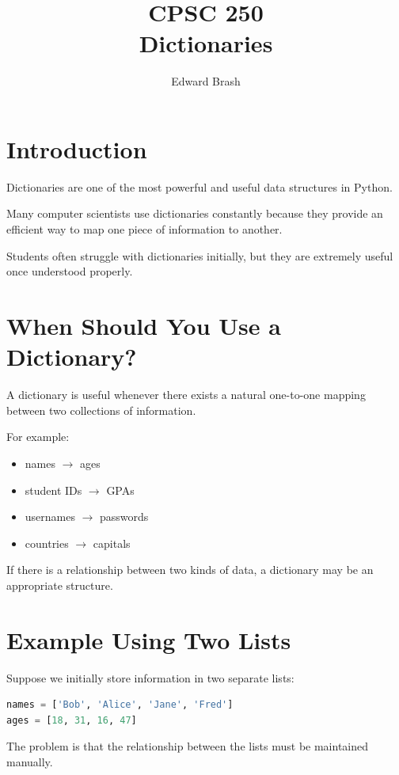 \documentclass[11pt]{article}
\title{CPSC 250 \\ Dictionaries}
\author{Edward Brash}
\date{}
\begin{document}
\maketitle

\section{Introduction}

Dictionaries are one of the most powerful and useful data structures in Python.

Many computer scientists use dictionaries constantly because they provide an efficient way to map one piece of information to another.

Students often struggle with dictionaries initially, but they are extremely useful once understood properly.

\section{When Should You Use a Dictionary?}

A dictionary is useful whenever there exists a natural one-to-one mapping between two collections of information.

For example:

\begin{itemize}
    \item names $\rightarrow$ ages
    \item student IDs $\rightarrow$ GPAs
    \item usernames $\rightarrow$ passwords
    \item countries $\rightarrow$ capitals
\end{itemize}

If there is a relationship between two kinds of data, a dictionary may be an appropriate structure.

\section{Example Using Two Lists}

Suppose we initially store information in two separate lists:

\begin{lstlisting}[language=Python]
names = ['Bob', 'Alice', 'Jane', 'Fred']
ages = [18, 31, 16, 47]
\end{lstlisting}

The problem is that the relationship between the lists must be maintained manually.
\end{document}
